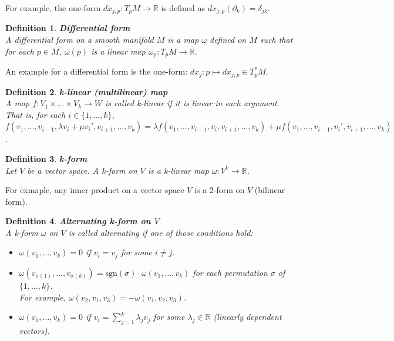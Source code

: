 \documentclass[11pt]{book} %
\newtheorem{definition}{Definition}[section]
\begin{document}
For example, the one-form $dx_{j,p} : T_pM \to \mathbb{R}$ is defined as $dx_{j,p}(\partial_k) = \delta_{jk}$.

\begin{definition}{\textbf{Differential form}} \\
    A differential form on a smooth manifold \( M \) is a map $\omega$ defined on $M$ such that for each $p \in M$,
    $\omega(p)$ is a linear map $\omega_p : T_pM \to \mathbb{R}$.
\end{definition}

An example for a differential form is the one-form: $dx_j : p \mapsto dx_{j,p} \in T_p^*M$.

\begin{definition}{\textbf{k-linear (multilinear) map}} \\
    A map $f : V_1 \times \ldots \times V_k \to W$ is called k-linear if it is linear in each argument. \\ 
    That is, for each $i \in \{1, \ldots, k\}$, \\
    $f(v_1, \ldots, v_{i-1}, \lambda v_i + \mu v_i', v_{i+1}, \ldots, v_k) = \lambda f(v_1, \ldots, v_{i-1}, v_i, v_{i+1}, \ldots, v_k) + \mu f(v_1, \ldots, v_{i-1}, v_i', v_{i+1}, \ldots, v_k)$.
\end{definition}

\begin{definition}{\textbf{k-form}} \\
    Let \(V \) be a vector space. 
    A k-form on \( V \) is a k-linear map $\omega : V^k \to \mathbb{R}$.
\end{definition}

For exmaple, any inner product on a vector space \( V \) is a 2-form on \( V \) (bilinear form).

\begin{definition}{\textbf{Alternating k-form on $V$}} \\
    A k-form $\omega$ on \( V \) is called alternating if one of those conditions hold:
    \begin{itemize}
        \item $\omega(v_1, \ldots, v_k) = 0$ if $v_i = v_j$ for some $i \neq j$.
        \item $\omega(v_{\sigma(1)}, \ldots, v_{\sigma(k)}) = \text{sgn}(\sigma) \cdot \omega(v_1, \ldots, v_k)$ for each permutation $\sigma$ of $\{1, \ldots, k\}$. \\
            For example, $\omega(v_2, v_1, v_3) = -\omega(v_1, v_2, v_3)$.
        \item $\omega(v_1, \ldots, v_k) = 0$ if $v_i = \sum_{j=1}^{k} \lambda_j v_j$ for some $\lambda_j \in \mathbb{R}$ (linearly dependent vectors).
    \end{itemize}
\end{definition}
\end{document}
